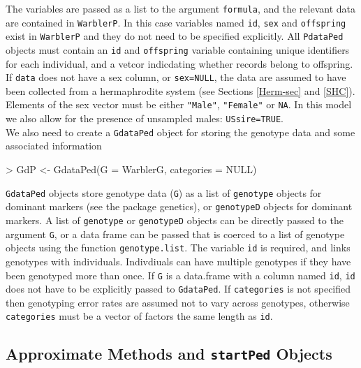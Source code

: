 \documentclass{article}
\begin{document}
The variables are passed as a list to the argument \texttt{formula}, and the relevant data are contained in \texttt{WarblerP}.  In this case variables named \texttt{id}, \texttt{sex} and \texttt{offspring} exist in \texttt{WarblerP} and they do not need to be specified explicitly.  All \texttt{PdataPed} objects must contain an \texttt{id} and \texttt{offspring} variable containing unique identifiers for each individual, and a vetcor indicdating whether records belong to offspring. If \texttt{data} does not have a sex column, or \texttt{sex=NULL}, the data are assumed to have been collected from a hermaphrodite system (see Sections \ref{Herm-sec} and \ref{SHC}). Elements of the sex vector must be either \texttt{"Male"}, \texttt{"Female"} or \texttt{NA}.  In this model we also allow for the presence of unsampled males: \texttt{USsire=TRUE}.\\

We also need to create a \texttt{GdataPed} object for storing the genotype data and some associated information

\begin{Schunk}
\begin{Sinput}
> GdP <- GdataPed(G = WarblerG, categories = NULL)
\end{Sinput}
\end{Schunk}

\texttt{GdataPed} objects store genotype data (\texttt{G}) as a list of \texttt{genotype} objects for dominant markers (see the package genetics), or \texttt{genotypeD} objects for dominant markers.  A list of \texttt{genotype} or \texttt{genotypeD} objects can be directly passed to the argument \texttt{G}, or a data frame can be passed that is coerced to a list of genotype objects using the function \texttt{genotype.list}. The variable \texttt{id} is required, and links genotypes with individuals.  Indivdiuals can have multiple genotypes if they have been genotyped more than once.  If \texttt{G} is a data.frame with a column named \texttt{id}, \texttt{id} does not have to be explicitly passed to \texttt{GdataPed}.  If \texttt{categories} is not specified then genotyping error rates are assumed not to vary across genotypes, otherwise \texttt{categories} must be a vector of factors the same length as \texttt{id}.\\

\subsection{Approximate Methods and \texttt{startPed} Objects}
\label{approx-sec}
\end{document}
